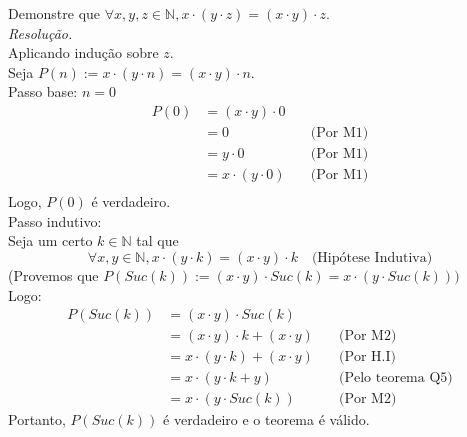 Demonstre que $\forall x, y, z \in \mathbb{N}, x \cdot (y \cdot z) = (x \cdot y) \cdot z$. \\
\emph{Resolução.} \\
Aplicando indução sobre $z$. \\
Seja $P(n) := x \cdot (y \cdot n) = (x \cdot y) \cdot n$. \\
Passo base: $n = 0$
\begin{align*}
    P(0) & = (x \cdot y) \cdot 0                         \\
         & = 0                   & \quad \text{(Por M1)} \\
         & = y \cdot 0           & \quad \text{(Por M1)} \\
         & = x \cdot (y \cdot 0) & \quad \text{(Por M1)} \\
\end{align*}
Logo, $P(0)$ é verdadeiro. \\
Passo indutivo: \\
Seja um certo $k \in \mathbb{N}$ tal que
\begin{displaymath}
    \forall x, y \in \mathbb{N}, x \cdot (y \cdot k) = (x \cdot y) \cdot k \quad \text{(Hipótese Indutiva)}
\end{displaymath}
(Provemos que $P(Suc(k)) := (x \cdot y) \cdot Suc(k) = x \cdot (y \cdot Suc(k)))$ \\
Logo:
\begin{align*}
    P(Suc(k)) & = (x \cdot y) \cdot Suc(k)                                           \\
              & =(x \cdot y) \cdot k + (x \cdot y)  & \quad \text{(Por M2)}          \\
              & = x \cdot (y \cdot k) + (x \cdot y) & \quad \text{(Por H.I)}         \\
              & = x \cdot (y \cdot k + y)           & \quad \text{(Pelo teorema Q5)} \\
              & = x \cdot (y \cdot Suc(k))          & \quad \text{(Por M2)}
\end{align*}
Portanto, $P(Suc(k))$ é verdadeiro e o teorema é válido.